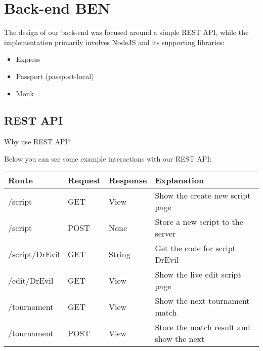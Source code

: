 \begin{center}
\end{center}

\section{Back-end {\color{green} BEN}}

The design of our back-end was focused around a simple REST API, while the implementation primarily involves NodeJS and its supporting libraries:
	\begin{itemize}
	        \item Express
		\item Passport (passport-local)
		\item Monk
	\end{itemize}

\subsection{REST API}
Why use REST API?

Below you can see some example interactions with our REST API:\\

\begin{center}
\begin{tabular}{| l | l | l | l |}\hline
Route & Request &  Response & Explanation\\\hline\hline
/script & GET & View & Show the create new script page\\\hline
/script & POST & None & Store a new script to the server\\\hline
/script/DrEvil & GET & String & Get the code for script DrEvil\\\hline
/edit/DrEvil & GET & View & Show the live edit script page\\\hline
/tournament & GET & View & Show the next tournament match\\\hline
/tournament & POST & View & Store the match result and show the next \\\hline
\end{tabular}
\end{center}

